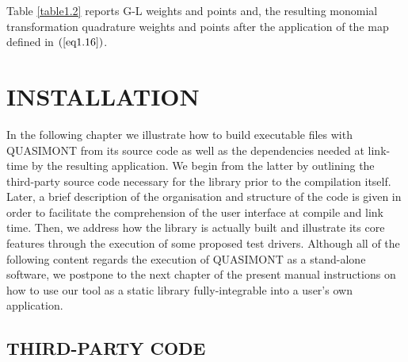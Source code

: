 \documentclass[a4paper, twosided]{book}
\begin{document}
\noindent
Table \ref{table1.2} reports G-L weights and points and, the resulting monomial transformation quadrature weights and points after the application of the map defined in $(\ref{eq1.16})$.

\chapter[Installation]{\Huge \ttfamily INSTALLATION}

In the following chapter we illustrate how to build executable files with QUASIMONT from its source code as well as the dependencies needed at link-time by the resulting application. We begin from the latter by outlining the third-party source code necessary for the library prior to the compilation itself. Later, a brief description of the organisation and structure of the code is given in order to facilitate the comprehension of the user interface at compile and link time. Then, we address how the library is actually built and illustrate its core features through the execution of some proposed test drivers. Although all of the following content regards the execution of QUASIMONT as a stand-alone software, we postpone to the next chapter of the present manual instructions on how to use our tool as a static library fully-integrable into a user's own application.

\section[Third-party code]{\changefont THIRD-PARTY CODE}\label{Sec2.1}
\end{document}
